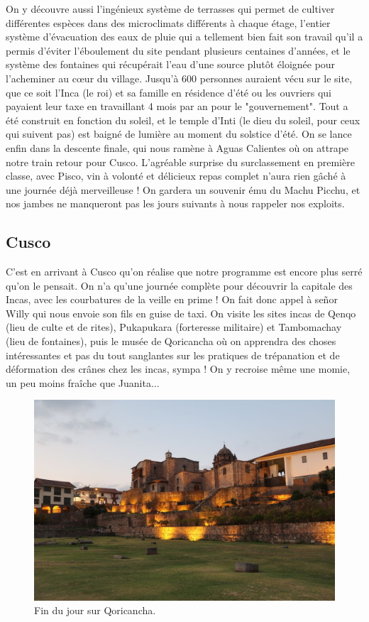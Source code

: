 On y découvre aussi l'ingénieux système de terrasses qui permet de
cultiver différentes espèces dans des microclimats différents à chaque
étage, l'entier système d'évacuation des eaux de pluie qui a tellement
bien fait son travail qu'il a permis d'éviter l'éboulement du site
pendant plusieurs centaines d'années, et le système des fontaines qui
récupérait l'eau d'une source plutôt éloignée pour l'acheminer au cœur
du village. Jusqu'à 600 personnes auraient vécu sur le site, que ce soit
l'Inca (le roi) et sa famille en résidence d'été ou les ouvriers qui
payaient leur taxe en travaillant 4 mois par an pour le "gouvernement".
Tout a été construit en fonction du soleil, et le temple d'Inti (le dieu
du soleil, pour ceux qui suivent pas) est baigné de lumière au moment du
solstice d'été. On se lance enfin dans la descente finale, qui nous
ramène à Aguas Calientes où on attrape notre train retour pour Cusco.
L'agréable surprise du surclassement en première classe, avec Pisco, vin
à volonté et délicieux repas complet n'aura rien gâché à une journée
déjà merveilleuse ! On gardera un souvenir ému du Machu Picchu, et nos
jambes ne manqueront pas les jours suivants à nous rappeler nos
exploits.

\hypertarget{cusco}{%
\subsection{Cusco}\label{cusco}}

C'est en arrivant à Cusco qu'on réalise que notre programme est encore
plus serré qu'on le pensait. On n'a qu'une journée complète pour
découvrir la capitale des Incas, avec les courbatures de la veille en
prime ! On fait donc appel à señor Willy qui nous envoie son fils en
guise de taxi. On visite les sites incas de Qenqo (lieu de culte et de
rites), Pukapukara (forteresse militaire) et Tambomachay (lieu de
fontaines), puis le musée de Qoricancha où on apprendra des choses
intéressantes et pas du tout sanglantes sur les pratiques de trépanation
et de déformation des crânes chez les incas, sympa ! On y recroise même
une momie, un peu moins fraîche que Juanita...

\begin{figure}
\centering
\includegraphics{images/20180911_qoricancha.JPG}
\caption{Fin du jour sur Qoricancha.}
\end{figure}

